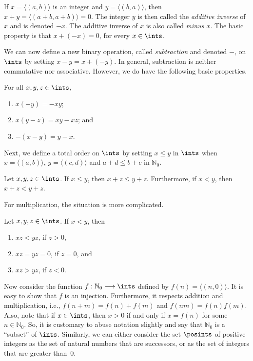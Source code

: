 If $x=\langle(a,b)\rangle$ is an integer and $y=
\langle(b,a)\rangle$, 
then $x+y=\langle(a+b,a+b)\rangle=0$.  
The integer $y$ is then
called the \textit{additive inverse} of $x$  and is denoted
$-x$.  The additive inverse of $x$ is also called \textit{minus $x$}.
The basic property is that $x + (-x) = 0$, for every $x\in \ints$.

We can now define a new binary operation, called \textit{subtraction}
and denoted $-$, on $\ints$ by
setting $x-y= x+(-y)$.  In general, subtraction is neither
commutative nor associative.  However, we do have the following
basic properties.

\begin{theorem}
For all $x,y,z\in\ints$,
\begin{enumerate}
\item $x(-y)=-xy$;
\item $x(y-z)= xy-xz$; and
\item $-(x-y)=y-x$.
\end{enumerate}
\end{theorem}

Next, we define a total order on $\ints$ by
setting $x\le y$ in $\ints$ when $x=\langle(a,b)\rangle$, $y=\langle(c,d)
\rangle$ and
$a+d \le b+c$ in $\mathbb{N}_0$.

\begin{theorem} 
Let $x,y,z\in \ints$.  If $x\le y$, then
$x+z\le y+z$.  Furthermore, if $x<y$, then $x+z<y+z$.
\end{theorem}

For multiplication, the situation is more complicated.

\begin{theorem}  
Let $x,y,z\in \ints$.  If
$x<y$, then
\begin{enumerate}
\item $xz<yz$, if $z>0$, 
\item $xz=yz=0$, if $z=0$, and
\item $xz>yz$, if $z<0$.
\end{enumerate}
\end{theorem}

Now consider the function $f:\mathbb{N}_0\longrightarrow \ints$ defined
by $f(n) = \langle(n,0)\rangle$.  It is easy to show that
$f$ is an injection.  Furthermore, it respects addition
and multiplication, i.e., $f(n+m)=f(n)+f(m)$ and
$f(nm)=f(n)f(m)$.   Also, note that if $x\in \ints$, then
$x>0$ if and only if $x=f(n)$ for some $n\in \mathbb{N}_0$. So, it is 
customary to abuse notation slightly and say that $\mathbb{N}_0$ is a 
``subset'' of $\ints$.  Similarly, we can either consider the set
$\posints$ of positive integers as the set of natural numbers that are
successors, or as the set of integers
that are greater than~$0$.

